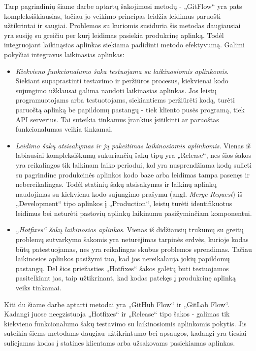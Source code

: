 \documentclass{VUMIFPSkursinis}
\begin{document}
Tarp pagrindinių šiame darbe aptartų šakojimosi metodų - „GitFlow“ yra pats kompleksiškiausias, tačiau jo veikimo principas leidžia leidimus paruošti užtikrintai ir saugiai. Problemos su kuriomis susiduria šis metodas daugiausiai yra susiję su greičiu per kurį leidimas pasiekia produkcinę aplinką. Todėl integruojant laikinąsias aplinkas siekiama padidinti metodo efektyvumą. Galimi pokyčiai integravus laikinasias aplinkas: 

\begin{itemize}
  \item \textit{Kiekvieno funkcionalumo šaka testuojama su laikinosiomis aplinkomis}. Siekiant supaprastinti testavimo ir peržiūros procesus, kiekvienai kodo sujungimo užklausai galima naudoti laikinasias aplinkas. Jos leistų programuotojams arba testuotojams, siekiantiems peržiūrėti kodą, turėti paruoštą aplinką be papildomų pastangų - tiek kliento pusės programą, tiek API serverius. Tai suteikia tinkamus įrankius įsitikinti ar paruoštas funkcionalumas veikia tinkamai.

  \item \textit{Leidimo šakų atsisakymas ir jų pakeitimas laikinosiomis aplinkomis}. Vienas iš labiausiai kompleksiškumą sukuriančių šakų tipų yra „Release“, nes šios šakos yra reikalingos tik laikinam laiko periodui, kol yra nusprendžiama kodą sulieti su pagrindine produkcinės aplinkos kodo baze arba leidimas tampa pasenęs ir nebereikalingas. Todėl statinių šakų atsisakymas ir laikinų aplinkų naudojimas su kiekvienu kodo sujungimo prašymu (angl. \textit{Merge Request}) iš „Development“ tipo aplinkos į „Production“, leistų turėti identifikuotus leidimus bei neturėti pastovių aplinkų laikinumu pasižyminčiam komponentui.
  
  \item \textit{„Hotfixes“ šakų laikinosios aplinkos}. Vienas iš didžiausių trūkumų su greitų problemų sutvarkymo šakomis yra neturėjimas tarpinės erdvės, kurioje kodas būtų patestuojamas, nes yra reikalingas skubus problemos sprendimas. Tačiau laikinosios aplinkos pasižymi tuo, kad jos nereikalauja jokių papildomų pastangų. Dėl šios priežasties „Hotfixes“ šakos galėtų būti testuojamos pasitelkiant jas, taip užtikrinant, kad kodas patekęs į produkcinę aplinką veiks tinkamai.

\end{itemize}

Kiti du šiame darbe aptarti metodai yra „GitHub Flow“ ir „GitLab Flow“. Kadangi juose neegzistuoja „Hotfixes“ ir „Release“ tipo šakos - galimas tik kiekvieno funkcionalumo šakų testavimo su laikinosiomis aplinkomis pokytis. Jis suteikia šiems metodams daugiau užtikrintumo bei apsaugos, kadangi yra tiesiai suliejamas kodas į statines klientams arba užsakovams pasiekiamas aplinkas.
\end{document}

